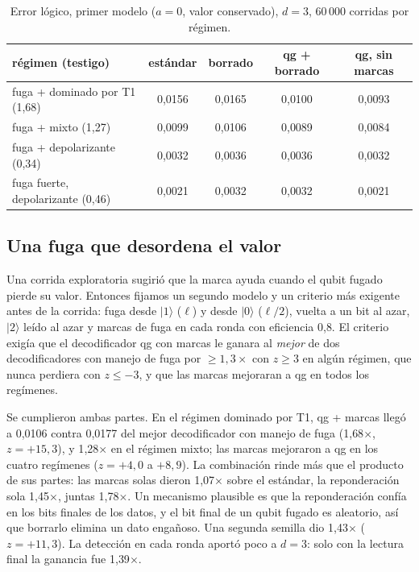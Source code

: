 \documentclass[11pt]{article}
\begin{document}
\begin{table}[t]
\centering\small
\caption{Error lógico, primer modelo ($a=0$, valor conservado), $d=3$, 60\,000 corridas por régimen.}
\label{tab:neg}
\begin{tabular}{lcccc}
\toprule
régimen (testigo) & estándar & borrado & qg + borrado & qg, sin marcas\\
\midrule
fuga + dominado por T1 (1{,}68) & 0{,}0156 & 0{,}0165 & 0{,}0100 & 0{,}0093\\
fuga + mixto (1{,}27) & 0{,}0099 & 0{,}0106 & 0{,}0089 & 0{,}0084\\
fuga + depolarizante (0{,}34) & 0{,}0032 & 0{,}0036 & 0{,}0036 & 0{,}0032\\
fuga fuerte, depolarizante (0{,}46) & 0{,}0021 & 0{,}0032 & 0{,}0032 & 0{,}0021\\
\bottomrule
\end{tabular}
\end{table}

\subsection{Una fuga que desordena el valor}

Una corrida exploratoria sugirió que la marca ayuda cuando el qubit fugado pierde su valor. Entonces
fijamos un segundo modelo y un criterio más exigente antes de la corrida: fuga desde $|1\rangle$
($\ell$) y desde $|0\rangle$ ($\ell/2$), vuelta a un bit al azar, $|2\rangle$ leído al azar y marcas de
fuga en cada ronda con eficiencia 0{,}8. El criterio exigía que el decodificador qg con marcas le
ganara al \emph{mejor} de dos decodificadores con manejo de fuga por $\ge1{,}3\times$ con $z\ge3$ en
algún régimen, que nunca perdiera con $z\le-3$, y que las marcas mejoraran a qg en todos los
regímenes.

Se cumplieron ambas partes. En el régimen dominado por T1, qg + marcas llegó a 0{,}0106 contra 0{,}0177
del mejor decodificador con manejo de fuga (1{,}68$\times$, $z=+15{,}3$), y 1{,}28$\times$ en el
régimen mixto; las marcas mejoraron a qg en los cuatro regímenes ($z=+4{,}0$ a $+8{,}9$). La
combinación rinde más que el producto de sus partes: las marcas solas dieron 1{,}07$\times$ sobre el
estándar, la reponderación sola 1{,}45$\times$, juntas 1{,}78$\times$. Un mecanismo plausible es que la
reponderación confía en los bits finales de los datos, y el bit final de un qubit fugado es aleatorio,
así que borrarlo elimina un dato engañoso. Una segunda semilla dio 1{,}43$\times$ ($z=+11{,}3$). La
detección en cada ronda aportó poco a $d=3$: solo con la lectura final la ganancia fue 1{,}39$\times$.
\end{document}
